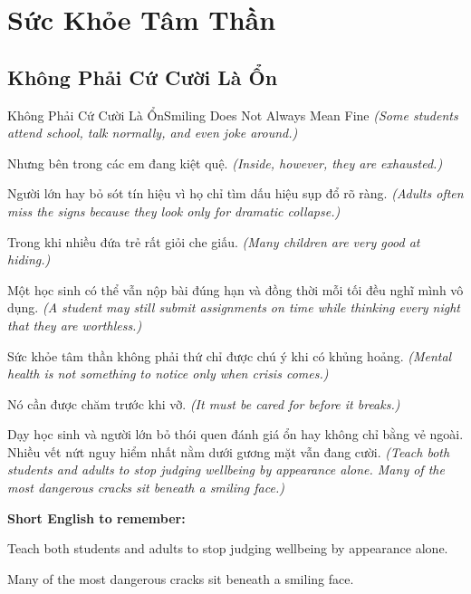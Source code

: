 \chapter{Sức Khỏe Tâm Thần}

\section{Không Phải Cứ Cười Là Ổn}
\begin{truyen}{Không Phải Cứ Cười Là Ổn}{Smiling Does Not Always Mean Fine}
\textit{(Some students attend school, talk normally, and even joke around.)}

Nhưng bên trong các em đang kiệt quệ.
\textit{(Inside, however, they are exhausted.)}

Người lớn hay bỏ sót tín hiệu vì họ chỉ tìm dấu hiệu sụp đổ rõ ràng.
\textit{(Adults often miss the signs because they look only for dramatic collapse.)}

Trong khi nhiều đứa trẻ rất giỏi che giấu.
\textit{(Many children are very good at hiding.)}

Một học sinh có thể vẫn nộp bài đúng hạn và đồng thời mỗi tối đều nghĩ mình vô dụng.
\textit{(A student may still submit assignments on time while thinking every night that they are worthless.)}

Sức khỏe tâm thần không phải thứ chỉ được chú ý khi có khủng hoảng.
\textit{(Mental health is not something to notice only when crisis comes.)}

Nó cần được chăm trước khi vỡ.
\textit{(It must be cared for before it breaks.)}

\end{truyen}

\begin{baihoc}
Dạy học sinh và người lớn bỏ thói quen đánh giá ổn hay không chỉ bằng vẻ ngoài. Nhiều vết nứt nguy hiểm nhất nằm dưới gương mặt vẫn đang cười.
\textit{(Teach both students and adults to stop judging wellbeing by appearance alone. Many of the most dangerous cracks sit beneath a smiling face.)}
\end{baihoc}

\begin{ghinhoanh}
\textbf{Short English to remember:}

Teach both students and adults to stop judging wellbeing by appearance alone.

Many of the most dangerous cracks sit beneath a smiling face.

\end{ghinhoanh}

